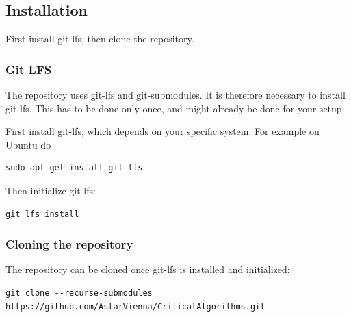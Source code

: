 \documentclass[11pt,oneside,a4paper]{article}
\begin{document}
\subsection{Installation}
\label{ssec:installation}
First install git-lfs, then clone the repository.

\subsubsection{Git LFS}
\label{sssec:gitlfs}
The repository uses git-lfs and git-submodules.
It is therefore necessary to install git-lfs.
This has to be done only once, and might already be done for your setup.

First install git-lfs, which depends on your specific system.
For example on Ubuntu do
\begin{lstlisting}
sudo apt-get install git-lfs
\end{lstlisting}

Then initialize git-lfs:
\begin{lstlisting}
git lfs install
\end{lstlisting}

\subsubsection{Cloning the repository}
\label{sssec:cloning}

The repository can be cloned once git-lfs is installed and initialized:

\begin{lstlisting}
git clone --recurse-submodules https://github.com/AstarVienna/CriticalAlgorithms.git
\end{lstlisting}



%
\end{document}
